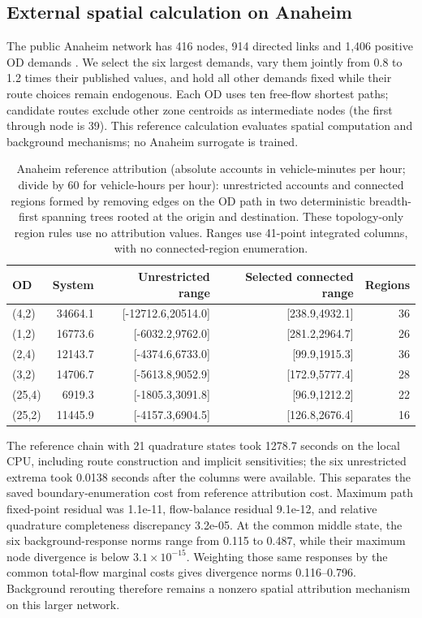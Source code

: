 \subsection{External spatial calculation on Anaheim}\label{sec:anaheim}
The public Anaheim network has 416 nodes, 914 directed links and 1,406 positive OD demands \citep{tnfrc2024transportation}. We select the six largest demands, vary them jointly from 0.8 to 1.2 times their published values, and hold all other demands fixed while their route choices remain endogenous. Each OD uses ten free-flow shortest paths; candidate routes exclude other zone centroids as intermediate nodes (the first through node is 39). This reference calculation evaluates spatial computation and background mechanisms; no Anaheim surrogate is trained.
\begin{table}[t]\centering\small
\caption{Anaheim reference attribution (absolute accounts in vehicle-minutes per hour; divide by 60 for vehicle-hours per hour): unrestricted accounts and connected regions formed by removing edges on the OD path in two deterministic breadth-first spanning trees rooted at the origin and destination. These topology-only region rules use no attribution values. Ranges use 41-point integrated columns, with no connected-region enumeration.}\label{tab:anaheim}
\begin{tabular}{lrrrr}\toprule
OD & System & Unrestricted range & Selected connected range & Regions\\\midrule
(4,2) & 34664.1 & [-12712.6,20514.0] & [238.9,4932.1] & 36\\
(1,2) & 16773.6 & [-6032.2,9762.0] & [281.2,2964.7] & 26\\
(2,4) & 12143.7 & [-4374.6,6733.0] & [99.9,1915.3] & 36\\
(3,2) & 14706.7 & [-5613.8,9052.9] & [172.9,5777.4] & 28\\
(25,4) & 6919.3 & [-1805.3,3091.8] & [96.9,1212.2] & 22\\
(25,2) & 11445.9 & [-4157.3,6904.5] & [126.8,2676.4] & 16\\
\bottomrule\end{tabular}\end{table}
The reference chain with 21 quadrature states took 1278.7 seconds on the local CPU, including route construction and implicit sensitivities; the six unrestricted extrema took 0.0138 seconds after the columns were available. This separates the saved boundary-enumeration cost from reference attribution cost. Maximum path fixed-point residual was 1.1e-11, flow-balance residual 9.1e-12, and relative quadrature completeness discrepancy 3.2e-05.
At the common middle state, the six background-response norms range from 0.115 to 0.487, while their maximum node divergence is below $3.1\times10^{-15}$. Weighting those same responses by the common total-flow marginal costs gives divergence norms 0.116--0.796. Background rerouting therefore remains a nonzero spatial attribution mechanism on this larger network. 

